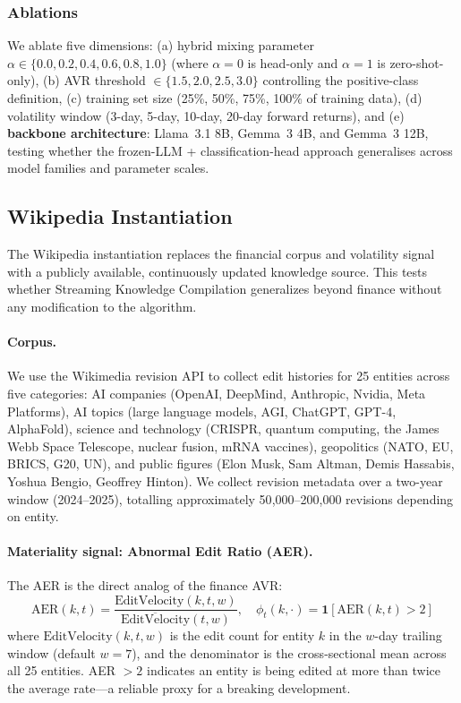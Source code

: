 \documentclass{article}
\begin{document}
\subsubsection{Ablations}
\label{sec:ablations}

We ablate five dimensions: (a) hybrid mixing parameter $\alpha \in \{0.0, 0.2, 0.4, 0.6, 0.8, 1.0\}$ (where $\alpha=0$ is head-only and $\alpha=1$ is zero-shot-only), (b) AVR threshold $\in \{1.5, 2.0, 2.5, 3.0\}$ controlling the positive-class definition, (c) training set size (25\%, 50\%, 75\%, 100\% of training data), (d) volatility window (3-day, 5-day, 10-day, 20-day forward returns), and (e) \textbf{backbone architecture}: Llama~3.1 8B, Gemma~3 4B, and Gemma~3 12B, testing whether the frozen-LLM + classification-head approach generalises across model families and parameter scales.

\subsection{Wikipedia Instantiation}
\label{sec:wiki_exp}

The Wikipedia instantiation replaces the financial corpus and volatility signal with a publicly available, continuously updated knowledge source.
This tests whether Streaming Knowledge Compilation generalizes beyond finance without any modification to the algorithm.

\paragraph{Corpus.}
We use the Wikimedia revision API to collect edit histories for 25 entities across five categories: AI companies (OpenAI, DeepMind, Anthropic, Nvidia, Meta Platforms), AI topics (large language models, AGI, ChatGPT, GPT-4, AlphaFold), science and technology (CRISPR, quantum computing, the James Webb Space Telescope, nuclear fusion, mRNA vaccines), geopolitics (NATO, EU, BRICS, G20, UN), and public figures (Elon Musk, Sam Altman, Demis Hassabis, Yoshua Bengio, Geoffrey Hinton).
We collect revision metadata over a two-year window (2024--2025), totalling approximately 50{,}000--200{,}000 revisions depending on entity.

\paragraph{Materiality signal: Abnormal Edit Ratio (AER).}
The AER is the direct analog of the finance AVR:
\begin{equation}
  \text{AER}(k, t) = \frac{\text{EditVelocity}(k, t, w)}{\overline{\text{EditVelocity}}(t, w)}, \quad
  \phi_t(k, \cdot) = \mathbf{1}[\text{AER}(k, t) > 2]
  \label{eq:aer}
\end{equation}
where $\text{EditVelocity}(k, t, w)$ is the edit count for entity $k$ in the $w$-day trailing window (default $w = 7$), and the denominator is the cross-sectional mean across all 25 entities.
AER $> 2$ indicates an entity is being edited at more than twice the average rate---a reliable proxy for a breaking development.
\end{document}
